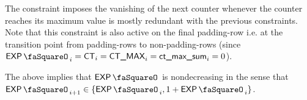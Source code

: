 \saNote{} The constraint imposes the vanishing of the next counter whenever the counter reaches its maximum value is mostly redundant with the previous constraints.
Note that this constraint is also active on the final padding-row i.e. at the transition point from padding-rows to non-padding-rows (since $\expStamp_{i} = \ct_{i} = \maxCt_{i} = \maxCtFlagSum_{i} = 0$).


\saNote{} The above implies that $\expStamp$ is nondecreasing in the sense that $\expStamp_{i + 1} \in \{ \expStamp_{i}, 1 + \expStamp_{i} \}$.

